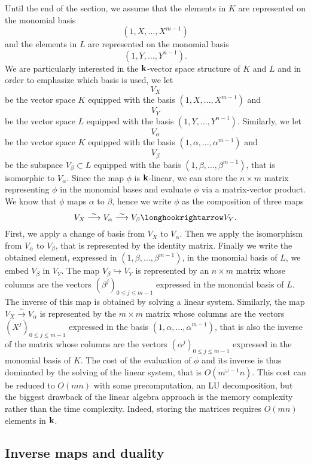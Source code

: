 Until the end of the section, we assume that the elements in $K$ are represented
on the monomial basis
\[
  (1, X, \dots, X^{m-1})
\]
and the elements in $L$ are represented on the monomial basis
\[
  (1, Y, \dots, Y^{n-1}).
\]
We are particularly interested in the $\mathbf{k}$-vector space structure of $K$ and
$L$ and in order to emphasize which basis is used, we let
\[
  V_X
\]
be the vector space $K$ equipped with the basis $(1, X, \dots, X^{m-1})$ and
\[
  V_Y
\]
be the vector space $L$ equipped with the basis $(1, Y, \dots, Y^{n-1})$.
Similarly, we let 
\[
  V_\alpha
\]
be the vector space $K$ equipped with the basis $(1, \alpha, \dots,
\alpha^{m-1})$ and
\[
  V_\beta
\]
be the subspace $V_\beta\subset L$ equipped with the basis $(1, \beta, \dots,
\beta^{m-1})$, that is isomorphic to $V_\alpha$.
Since the map $\phi$ is $\mathbf{k}$-linear, we can store the $n\times m$ matrix representing $\phi$
in the monomial bases and evaluate $\phi$ via a matrix-vector product. We know
that $\phi$ maps $\alpha$ to $\beta$, hence we write $\phi$ as the composition
of three maps
\[
  V_X \overset{\sim}{\longrightarrow} V_\alpha \overset{\sim}{\longrightarrow}
  V_\beta \longhookrightarrow V_Y.
\]
First, we apply a change of basis from $V_X$ to $V_\alpha$. Then we apply the
isomorphism from $V_\alpha$ to $V_\beta$, that is represented by the
identity matrix. Finally we write the obtained element, expressed in $(1,
\beta, \dots, \beta^{m-1})$, in the
monomial basis of $L$, \ie we embed $V_\beta$ in $V_Y$. The map
$V_\beta\hookrightarrow V_Y$ is represented by an $n\times m$ matrix whose
columns are the vectors $(\beta^j)_{0\leq j\leq m-1}$ expressed in the monomial
basis of $L$. The inverse of this map is obtained by solving a linear system.
Similarly, the map $V_X\overset{\sim}{\to}V_\alpha$ is represented
by the $m\times m$ matrix whose columns are the vectors $(X^j)_{0\leq j\leq
m-1}$ expressed in the basis $(1, \alpha, \dots, \alpha^{m-1})$, that is also
the inverse of the matrix whose columns are the vectors $(\alpha^j)_{0\leq j\leq
m-1}$ expressed in the monomial basis of $K$. The cost of the evaluation of
$\phi$ and its inverse is thus dominated by the solving of the linear system,
that is $O(m^{\omega-1}n)$. This cost can be reduced to $O(mn)$ with some
precomputation, \eg an LU decomposition, but the biggest drawback of the linear
algebra approach is the memory complexity rather than the time complexity.
Indeed, storing the matrices requires $O(mn)$ elements in $\mathbf{k}$.

\subsection{Inverse maps and duality}
\label{sec:duality}

